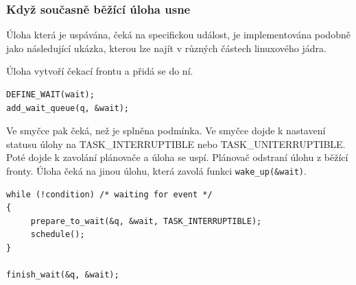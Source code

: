 \documentclass[
  master=true,
  font=sans,
  printversion=false,
  joinlists=true,
  figures=true,
  tables=true,
  sourcecodes=false,
  theorems=false,
  bibencoding=utf8,
  language=czech,
  encoding=utf8,
  field=ainfk,
  biblatex,
  glossaries,
  index
]{kidiplom}
\begin{document}

%
%
%
%
%
%

%
\subsubsection{Když současně běžící úloha usne}

Úloha která je uspávána, čeká na specifickou událost, je implementována podobně jako následující ukázka, kterou lze najít v různých částech linuxového jádra.

%
Úloha vytvoří čekací frontu a přidá se do ní. 
\nopagebreak
\begin{verbatim}
DEFINE_WAIT(wait);
add_wait_queue(q, &wait);
\end{verbatim}
Ve smyčce pak čeká, než je splněna podmínka. Ve smyčce dojde k nastavení statusu úlohy na TASK\_INTERRUPTIBLE nebo TASK\_UNITERRUPTIBLE. Poté dojde k zavolání plánovače a úloha se uspí. Plánovač odstraní úlohu z běžící fronty. Úloha čeká na jinou úlohu, která zavolá funkci \verb#wake_up(&wait)#.
 
\begin{verbatim}
while (!condition) /* waiting for event */
{ 
     prepare_to_wait(&q, &wait, TASK_INTERRUPTIBLE); 
     schedule(); 
} 

finish_wait(&q, &wait);
\end{verbatim}
\end{document}
